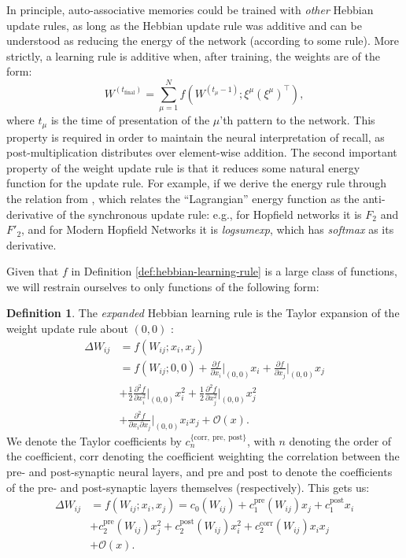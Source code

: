 \documentclass{article}
\theoremstyle{definition}
\newtheorem{definition}{Definition}[subsection]
\begin{document}
In principle, auto-associative memories could be trained with
\textit{other} Hebbian update rules, as long as the Hebbian update
rule was additive and can be understood as reducing the energy of the network
(according to some rule). More strictly, a learning rule is additive when,
after training, the weights are of the form:
\begin{equation}
  W^{(t_\text{final})} = \sum^N_{\mu = 1} f(W^{(t_\mu - 1)}; \xi^\mu
  (\xi^\mu)^\top),
\end{equation}
where $t_\mu$ is the time of presentation of the $\mu$'th pattern to
the network.
This property is required in order to maintain the neural interpretation
of recall, as post-multiplication distributes over element-wise addition.
The second important property of the weight update rule is that it reduces
some natural energy function for the update rule. For example, if we derive the
energy rule through the relation from
\textcite{krotov_hierarchical_2021}, which relates
the ``Lagrangian'' energy function as the anti-derivative of the
synchronous update rule: e.g., for Hopfield networks it is $F_2$ and $F'_2$,
and for Modern Hopfield Networks \parencite{ramsauer_hopfield_2021} it is
\textit{logsumexp}, which has \textit{softmax} as its derivative.

Given that $f$ in
Definition \ref{def:hebbian-learning-rule} is a large class of functions,
we will restrain ourselves to only functions of the following form:
\begin{definition}\label{def:expanded-learning}
  The \textit{expanded} Hebbian learning rule is the Taylor expansion
  of the weight update rule about $(0, 0)$
  \parencite{gerstner_mathematical_2002}:
  \begin{align*}
    \Delta W_{ij} &= f(W_{ij}; x_i, x_j) \\
    &= f(W_{ij}; 0, 0) + \frac{\partial f}{\partial x_i} \big|_{(0,
    0)} x_i + \frac{\partial f}{\partial x_j}
    \big|_{(0, 0)} x_j \\
    &+ \frac{1}{2} \frac{\partial^2 f}{\partial x^2_i} \big|_{(0, 0)}
    x_i^2 + \frac{1}{2} \frac{\partial^2 f}{\partial x^2_j}\big|_{(0,
    0)} x_j^2 \\
    &+ \frac{\partial^2 f}{\partial x_i \partial x_j}\big|_{(0, 0)}
    x_i x_j + \mathcal{O}(x).
  \end{align*}
  We denote the Taylor coefficients by
  $c_n^{\{\text{corr},~\text{pre},~\text{post}\}}$, with
  $n$ denoting the order of the coefficient, $\text{corr}$ denoting
  the coefficient
  weighting the correlation between the pre- and post-synaptic neural
  layers, and
  $\text{pre}$ and $\text{post}$ to denote the coefficients of the
  pre- and post-synaptic
  layers themselves (respectively).
  This gets us:
  \begin{align*}
    \Delta W_{ij} &= f(W_{ij}; x_i, x_j) =
    c_0 (W_{ij}) + c_1^\text{pre} (W_{ij}) x_j + c_1^\text{post} x_i \\
    &+ c_2^\text{pre} (W_{ij}) x_j^2 + c_2^\text{post} (W_{ij}) x_i^2
    + c_2^\text{corr} (W_{ij}) x_i x_j \\
    &+ \mathcal{O} (x).
  \end{align*}
\end{definition}
\end{document}
